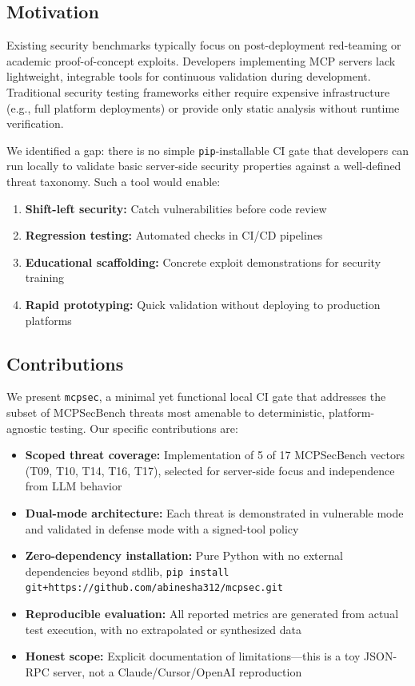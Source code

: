 \documentclass[11pt]{article}
\begin{document}
\subsection{Motivation}

Existing security benchmarks typically focus on post-deployment red-teaming or academic proof-of-concept exploits. Developers implementing MCP servers lack lightweight, integrable tools for continuous validation during development. Traditional security testing frameworks either require expensive infrastructure (e.g., full platform deployments) or provide only static analysis without runtime verification.

We identified a gap: there is no simple \texttt{pip}-installable CI gate that developers can run locally to validate basic server-side security properties against a well-defined threat taxonomy. Such a tool would enable:

\begin{enumerate}
    \item \textbf{Shift-left security:} Catch vulnerabilities before code review
    \item \textbf{Regression testing:} Automated checks in CI/CD pipelines
    \item \textbf{Educational scaffolding:} Concrete exploit demonstrations for security training
    \item \textbf{Rapid prototyping:} Quick validation without deploying to production platforms
\end{enumerate}

\subsection{Contributions}

We present \texttt{mcpsec}, a minimal yet functional local CI gate that addresses the subset of MCPSecBench threats most amenable to deterministic, platform-agnostic testing. Our specific contributions are:

\begin{itemize}
    \item \textbf{Scoped threat coverage:} Implementation of 5 of 17 MCPSecBench vectors (T09, T10, T14, T16, T17), selected for server-side focus and independence from LLM behavior
    \item \textbf{Dual-mode architecture:} Each threat is demonstrated in vulnerable mode and validated in defense mode with a signed-tool policy
    \item \textbf{Zero-dependency installation:} Pure Python with no external dependencies beyond stdlib, \texttt{pip install git+https://github.com/abinesha312/mcpsec.git}
    \item \textbf{Reproducible evaluation:} All reported metrics are generated from actual test execution, with no extrapolated or synthesized data
    \item \textbf{Honest scope:} Explicit documentation of limitations—this is a toy JSON-RPC server, not a Claude/Cursor/OpenAI reproduction
\end{itemize}
\end{document}
